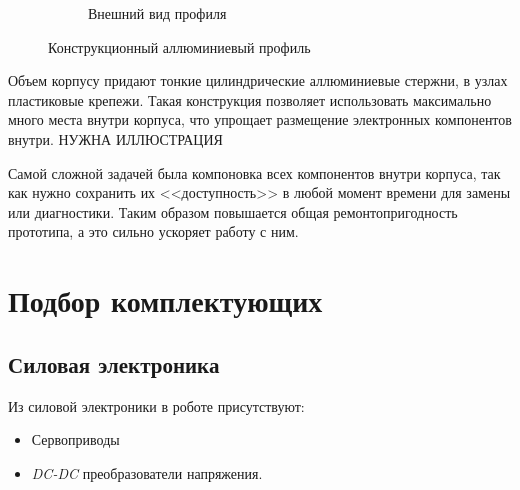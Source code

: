 \begin{figure}[ht]
\begin{subfigure}[b]{0.45\textwidth}
        \caption{Внешний вид профиля}
    \end{subfigure}
     
    \caption{Конструкционный аллюминиевый профиль}
    \label{}
\end{figure}

Объем корпусу придают тонкие цилиндрические аллюминиевые стержни, в узлах пластиковые крепежи. Такая конструкция позволяет использовать максимально много места внутри корпуса, что упрощает размещение электронных компонентов внутри. \fixme НУЖНА ИЛЛЮСТРАЦИЯ

Самой сложной задачей была компоновка всех компонентов внутри корпуса, так как нужно сохранить их <<доступность>> в любой момент времени для замены или диагностики. Таким образом повышается общая ремонтопригодность прототипа, а это сильно ускоряет работу с ним.

\section{Подбор комплектующих}
\subsection{Силовая электроника}
Из силовой электроники в роботе присутствуют:
\begin{itemize}
    \item Сервоприводы
    \item \textit{DC-DC} преобразователи напряжения.
\end{itemize}

